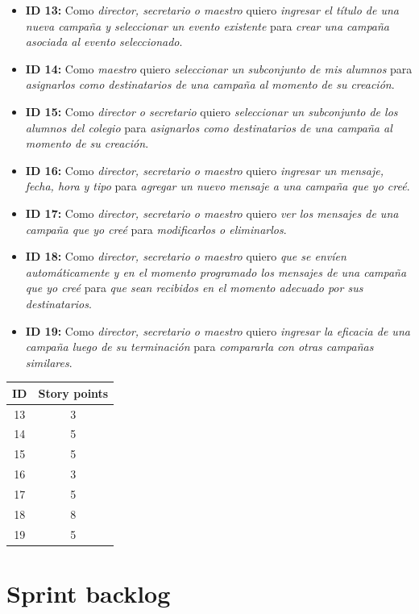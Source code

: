 \documentclass[a4paper, 10pt, twoside]{article}
\newenvironment{stories}{
  \begin{itemize}
}{
  \end{itemize}
}
\newcommand{\story}[4]{
  \item
  \textbf{ID #1:} Como \emph{#2} quiero \emph{#3} para \emph{#4}.
}
\begin{document}
\begin{stories}
  \story{13}{director, secretario o maestro}
        {ingresar el título de una nueva campaña y seleccionar un evento existente}
        {crear una campaña asociada al evento seleccionado}

  \story{14}{maestro}
        {seleccionar un subconjunto de mis alumnos}
        {asignarlos como destinatarios de una campaña al momento de su creación}

  \story{15}{director o secretario}
        {seleccionar un subconjunto de los alumnos del colegio}
        {asignarlos como destinatarios de una campaña al momento de su creación}

  \story{16}{director, secretario o maestro}
        {ingresar un mensaje, fecha, hora y tipo}
        {agregar un nuevo mensaje a una campaña que yo creé}

  \story{17}{director, secretario o maestro}
        {ver los mensajes de una campaña que yo creé}
        {modificarlos o eliminarlos}

  \story{18}{director, secretario o maestro}
        {que se envíen automáticamente y en el momento programado los mensajes de una campaña que yo creé}
        {que sean recibidos en el momento adecuado por sus destinatarios}

  \story{19}{director, secretario o maestro}
        {ingresar la eficacia de una campaña luego de su terminación}
        {compararla con otras campañas similares}
\end{stories}

\begin{center}
\begin{tabular}{|c|c|}
\hline
ID & Story points\\
\hline
13 & 3\\
14 & 5\\
15 & 5\\
16 & 3\\
17 & 5\\
18 & 8\\
19 & 5\\
\hline
\end{tabular}
\end{center}




\newpage
\section{Sprint backlog}
\end{document}
